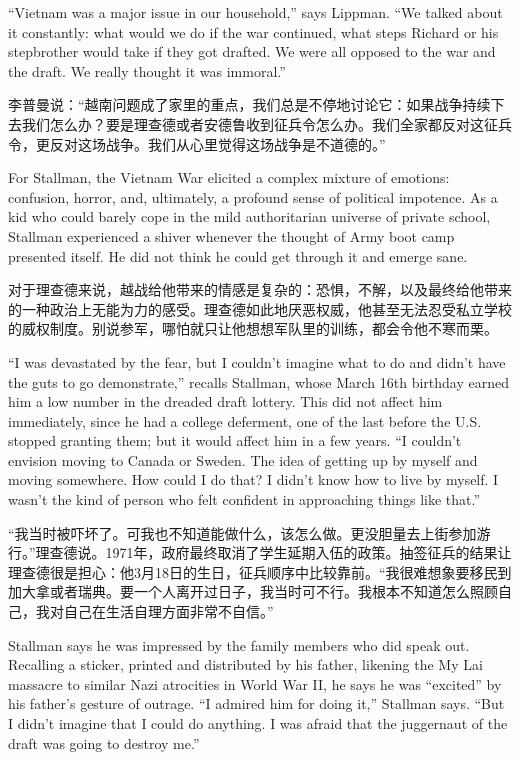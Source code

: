 \ifdefined\eng
``Vietnam was a major issue in our household,'' says Lippman. ``We talked about it constantly: what would we do if the war continued, what steps Richard or his stepbrother would take if they got drafted. We were all opposed to the war and the draft. We really thought it was immoral.''
\fi

\ifdefined\chs
李普曼说：“越南问题成了家里的重点，我们总是不停地讨论它：如果战争持续下去我们怎么办？要是理查德或者安德鲁收到征兵令怎么办。我们全家都反对这征兵令，更反对这场战争。我们从心里觉得这场战争是不道德的。”
\fi

\ifdefined\eng
For Stallman, the Vietnam War elicited a complex mixture of emotions: confusion, horror, and, ultimately, a profound sense of political impotence. As a kid who could barely cope in the mild authoritarian universe of private school, Stallman experienced a shiver whenever the thought of Army boot camp presented itself. He did not think he could get through it and emerge sane.
\fi

\ifdefined\chs
对于理查德来说，越战给他带来的情感是复杂的：恐惧，不解，以及最终给他带来的一种政治上无能为力的感受。理查德如此地厌恶权威，他甚至无法忍受私立学校的威权制度。别说参军，哪怕就只让他想想军队里的训练，都会令他不寒而栗。
\fi

\ifdefined\eng
``I was devastated by the fear, but I couldn't imagine what to do and didn't have the guts to go demonstrate,'' recalls Stallman, whose March 16th birthday earned him a low number in the dreaded draft lottery.  This did not affect him immediately, since he had a college deferment, one of the last before the U.S. stopped granting them; but it would affect him in a few years. ``I couldn't envision moving to Canada or Sweden. The idea of getting up by myself and moving somewhere. How could I do that? I didn't know how to live by myself. I wasn't the kind of person who felt confident in approaching things like that.''
\fi

\ifdefined\chs
“我当时被吓坏了。可我也不知道能做什么，该怎么做。更没胆量去上街参加游行。”理查德说。1971年，政府最终取消了学生延期入伍的政策。抽签征兵的结果让理查德很是担心：他3月18日的生日，征兵顺序中比较靠前。“我很难想象要移民到加大拿或者瑞典。要一个人离开过日子，我当时可不行。我根本不知道怎么照顾自己，我对自己在生活自理方面非常不自信。”
\fi

\ifdefined\eng
Stallman says he was impressed by the family members who did speak out. Recalling a sticker, printed and distributed by his father, likening the My Lai massacre to similar Nazi atrocities in World War II, he says he was ``excited'' by his father's gesture of outrage. ``I admired him for doing it,'' Stallman says. ``But I didn't imagine that I could do anything. I was afraid that the juggernaut of the draft was going to destroy me.''
\fi

